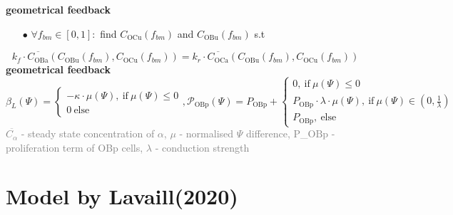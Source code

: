 \documentclass[%
aspectratio=169,  %
]{beamer}
\begin{document}
\begin{frame}
\textbf{geometrical feedback}
\begin{itemize}
	\item[$\bullet$] $\forall f_{bm} \in [0,1]:$ find $C_\text{OCu}(f_{bm})$ and $C_\text{OBu}(f_{bm})$ s.t 
\end{itemize}
\begin{equation}
	 k_f \cdot \overline{C_\text{OBa}} (C_\text{OBu}(f_{bm}),C_\text{OCu}(f_{bm})) = k_r \cdot  \overline{C_\text{OCa}}(C_\text{OBu}(f_{bm}),C_\text{OCu}(f_{bm})) 
\end{equation}
\textbf{geometrical feedback}
\begin{equation}
	\beta_L (\Psi) = \begin{cases} -\kappa \cdot \mu(\Psi), ~ \text{if} ~ \mu(\Psi) \leq 0\\
		0 ~ \text{else} \end{cases}, 
	\mathcal{P}_\text{OBp} (\Psi) =P_\text{OBp}  +  \begin{cases} 0 , ~ \text{if} ~ \mu(\Psi) \leq 0 \\ 
															P_\text{OBp}  \cdot \lambda \cdot \mu(\Psi) ,~\text{if} ~\mu(\Psi) \in(0,\frac{1}{\lambda}) \\
														P_\text{OBp},  ~\text{else}
											\end{cases}
\label{eq:model3-feedback}
\end{equation}
\textcolor{gray}{$\overline{C_\alpha}$ - steady state concentration of $\alpha$, $\mu$ - normalised $\Psi$ difference, P_$\text{OBp}$ - proliferation term of OBp cells, $\lambda$ - conduction strength}
\end{frame}

\section*{Model by Lavaill(2020)}
\end{document}
